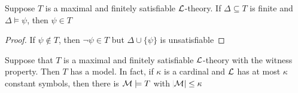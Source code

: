 \documentclass[11pt]{article}
\begin{document}
\begin{lemma}[]
Suppose \(T\) is a maximal and finitely satisfiable \(\mathcal{L}\)-theory. If
\(\Delta\subseteq T\) is finite and \(\Delta\models\psi\), then \(\psi\in T\)
\end{lemma}

\begin{proof}
If \(\psi\not\in T\), then \(\neg\psi\in T\) but \(\Delta\cup\{\psi\}\) is
unsatisfiable 
\end{proof}

\begin{lemma}[]
Suppose that \(T\) is a maximal and finitely satisfiable \(\mathcal{L}\)-theory with
the witness property. Then \(T\) has a model. In fact, if \(\kappa\) is a cardinal
and \(\mathcal{L}\) has at most \(\kappa\) constant symbols, then there is
\(\mathcal{M}\models T\) with \(\abs{\mathcal{M}}\le\kappa\)
\end{lemma}
\end{document}
